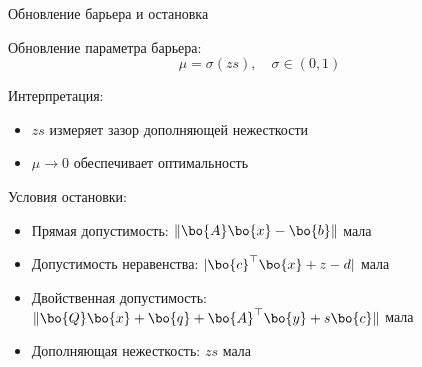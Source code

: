 \documentclass{beamer}
\begin{document}
\begin{frame}{Обновление барьера и остановка}
	\begin{flushleft}
		
		Обновление параметра барьера:
		\[
		\mu = \sigma (z s), \quad \sigma \in (0,1)
		\]
		
		\vspace{0.5em}
		
		Интерпретация:
		\begin{itemize}
			\item $zs$ измеряет зазор дополняющей нежесткости
			\item $\mu \to 0$ обеспечивает оптимальность
		\end{itemize}
		
		\vspace{0.5em}
		
		Условия остановки:
		\begin{itemize}
			\item Прямая допустимость: $\|\bo{A}\bo{x} - \bo{b}\|$ мала
			\item Допустимость неравенства: $|\bo{c}^\top \bo{x} + z - d|$ мала
			\item Двойственная допустимость: $\|\bo{Q}\bo{x} + \bo{q} + \bo{A}^\top \bo{y} + s\bo{c}\|$ мала
			\item Дополняющая нежесткость: $zs$ мала
		\end{itemize}
		
	\end{flushleft}
\end{frame}









\myqrframe
\end{document}
